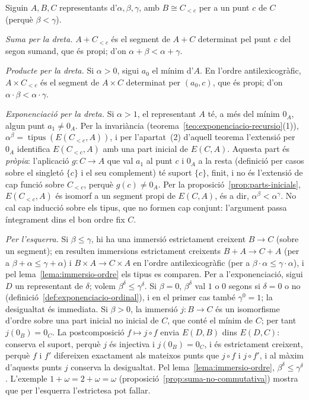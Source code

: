 \begin{prova}
Siguin \(A,B,C\) representants d'\(\alpha,\beta,\gamma\), amb
\(B\cong C_{<c}\) per a un punt \(c\) de \(C\) (perquè \(\beta<\gamma\)).

\emph{Suma per la dreta.} \(A+C_{<c}\) és el segment de \(A+C\) determinat
pel punt \(c\) del segon sumand, que és propi; d'on
\(\alpha+\beta<\alpha+\gamma\).

\emph{Producte per la dreta.} Si \(\alpha>0\), sigui \(a_0\) el mínim d'\(A\).
En l'ordre antilexicogràfic, \(A\times C_{<c}\) és el segment de
\(A\times C\) determinat per \((a_0,c)\), que és propi; d'on
\(\alpha\cdot\beta<\alpha\cdot\gamma\).

\emph{Exponenciació per la dreta.} Si \(\alpha>1\), el representant \(A\)
té, a més del mínim \(0_A\), algun punt \(a_1\neq0_A\). Per la invariància
(teorema~\ref{teo:exponenciacio-recursio}(1)),
\(\alpha^{\beta}=\operatorname{tipus}(E(C_{<c},A))\), i per
l'apartat~(2) d'aquell teorema l'extensió per \(0_A\) identifica
\(E(C_{<c},A)\) amb una part inicial de \(E(C,A)\). Aquesta part és
\emph{pròpia}: l'aplicació \(g\colon C\to A\) que val \(a_1\) al punt \(c\) i
\(0_A\) a la resta (definició per casos sobre el singletó \(\{c\}\) i el seu
complement) té suport \(\{c\}\), finit, i no és l'extensió de cap funció
sobre \(C_{<c}\), perquè \(g(c)\neq0_A\). Per la
proposició~\ref{prop:parts-inicials}, \(E(C_{<c},A)\) és isomorf a un segment
propi de \(E(C,A)\), és a dir, \(\alpha^{\beta}<\alpha^{\gamma}\). No cal cap
inducció sobre els tipus, que no formen cap conjunt: l'argument passa
íntegrament dins el bon ordre fix \(C\).

\emph{Per l'esquerra.} Si \(\beta\le\gamma\), hi ha una immersió estrictament
creixent \(B\to C\) (sobre un segment); en resulten immersions estrictament
creixents \(B+A\to C+A\) (per a \(\beta+\alpha\le\gamma+\alpha\)) i
\(B\times A\to C\times A\) en l'ordre antilexicogràfic (per a
\(\beta\cdot\alpha\le\gamma\cdot\alpha\)),
i pel lema~\ref{lema:immersio-ordre} els tipus es comparen. Per a
l'exponenciació, sigui \(D\) un representant de \(\delta\); volem
\(\beta^{\delta}\le\gamma^{\delta}\). Si \(\beta=0\), \(\beta^{\delta}\) val
\(1\) o \(0\) segons si \(\delta=0\) o no
(definició~\ref{def:exponenciacio-ordinal}), i en el primer cas també
\(\gamma^{0}=1\); la desigualtat és immediata. Si \(\beta>0\), la immersió
\(j\colon B\to C\) és un isomorfisme d'ordre sobre una part inicial no
inicial de \(C\), que conté el mínim de \(C\); per tant \(j(0_B)=0_C\). La
postcomposició \(f\mapsto j\circ f\) envia \(E(D,B)\) dins \(E(D,C)\): conserva
el suport, perquè \(j\) és injectiva i \(j(0_B)=0_C\), i és estrictament
creixent, perquè \(f\) i \(f'\) difereixen exactament als mateixos punts que
\(j\circ f\) i \(j\circ f'\), i al màxim d'aquests punts \(j\) conserva la
desigualtat. Pel lema~\ref{lema:immersio-ordre},
\(\beta^{\delta}\le\gamma^{\delta}\). L'exemple \(1+\omega=2+\omega=\omega\)
(proposició~\ref{prop:suma-no-commutativa}) mostra que per l'esquerra
l'estrictesa pot fallar.
\end{prova}

